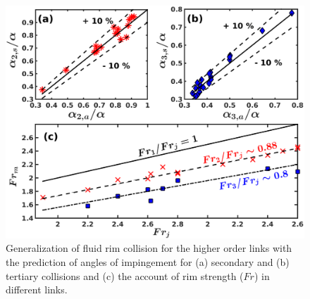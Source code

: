 \begin{figure}
    \centering
    \includegraphics[width=0.8\linewidth]{chapters/jetJet/Figure12}
    \caption{Generalization of fluid rim collision for the higher order links with the prediction of angles of impingement for (a) secondary and (b) tertiary collisions and (c) the account of rim strength ($Fr$) in different links.}
    \label{Figure::secondGraph}
\end{figure}
